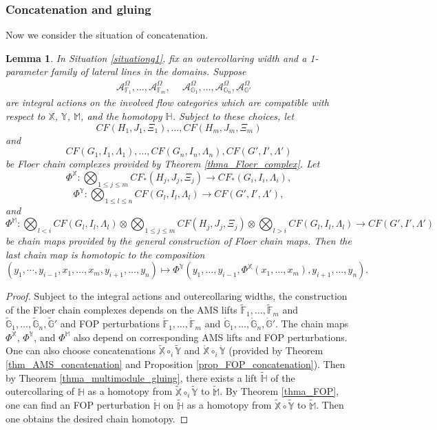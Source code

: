\documentclass[reqno, 10pt]{amsart}
\numberwithin{equation}{section}
\numberwithin{equation}{section}
\newtheorem{lemma}[thm]{Lemma}
\theoremstyle{definition}
\theoremstyle{remark}
\newcommand{\beqn}{\begin{equation*}}
\newcommand{\eeqn}{\end{equation*}}
\newcommand{\mb}{\mathbb}
\newcommand{\mc}{\mathcal}
\begin{document}
\subsubsection{Concatenation and gluing}

Now we consider the situation of concatenation. 

\begin{lemma}\label{lemma135}
In Situation \ref{situationg1}, fix an outercollaring width and a 1-parameter family of lateral lines in the domains. Suppose
\begin{align*}
&\ {\mc A}_{{\mb F}_1}^{\Omega},\ldots, {\mc A}_{{\mb F}_m}^\Omega,\ &\ {\mc A}_{{\mb G}_1}^\Omega,\ldots, {\mc A}_{{\mb G}_n}^\Omega, {\mc A}_{{\mb G}'}^\Omega
\end{align*}
are integral actions on the involved flow categories which are compatible with respect to ${\mb X}$, ${\mb Y}$, ${\mb M}$, and the homotopy ${\mb H}$. Subject to these choices, let
\beqn
CF(H_1, J_1, \Xi_1), \ldots, CF(H_m, J_m, \Xi_m)
\eeqn
and 
\beqn
CF(G_1, I_1, \Lambda_1), \ldots, CF(G_n, I_n, \Lambda_n), CF(G', I', \Lambda')
\eeqn
be Floer chain complexes provided by Theorem \ref{thma_Floer_complex}. Let 
\beqn
\Phi^{{\mb X}}: \bigotimes_{1\leq j \leq m} CF_*(H_j, J_j, \Xi_j) \to CF_*(G_i, I_i, \Lambda_i),
\eeqn
\beqn
\Phi^{\mb Y}: \bigotimes_{1 \leq l \leq n} CF(G_l, I_l, \Lambda_l) \to CF(G', I', \Lambda'),
\eeqn
and
\beqn
\Phi^{{\mb M}}: \bigotimes_{l<i} CF(G_l, I_l, \Lambda_l) \otimes \bigotimes_{1 \leq j \leq m} CF(H_j, J_j, \Xi_j) \otimes \bigotimes_{l>i} CF(G_l, I_l, \Lambda_l) \to CF(G', I', \Lambda')
\eeqn
be chain maps provided by the general construction of Floer chain maps. Then the last chain map is homotopic to the composition
\beqn
(y_1, \cdots, y_{i-1}, x_1, \ldots, x_m, y_{i+1}, \ldots, y_n) \mapsto \Phi^{{\mb Y}} (y_1, \ldots, y_{i-1}, \Phi^{\mb X}(x_1,\ldots, x_m), y_{i+1}, \ldots, y_n).
\eeqn
\end{lemma}

\begin{proof}
Subject to the integral actions and outercollaring widths, the construction of the Floer chain complexes depends on the AMS lifts $\tilde {\mb F}_1, \ldots, \tilde {\mb F}_m$ and $\tilde {\mb G}_1, \ldots, \tilde {\mb G}_n, \tilde {\mb G}'$ and FOP perturbations $\mathring {\mb F}_1, \ldots, \mathring {\mb F}_m$ and $\mathring {\mb G}_1, \ldots, \mathring {\mb G}_n, \mathring {\mb G}'$. The chain maps $\Phi^{\mb X}$, $\Phi^{\mb Y}$, and $\Phi^{\mb M}$ also depend on corresponding AMS lifts and FOP perturbations. One can also choose concatenations $\tilde {\mb X} \circ_i \tilde {\mb Y}$ and $\mathring {\mb X} \circ_i \mathring {\mb Y}$ (provided by Theorem \ref{thm_AMS_concatenation} and Proposition \ref{prop_FOP_concatenation}). 
Then by Theorem \ref{thma_multimodule_gluing}, there exists a lift $\tilde {\mb H}$ of the outercollaring of ${\mb H}$ as a homotopy from $\tilde {\mb X} \circ_i \tilde {\mb Y}$ to $\tilde {\mb M}$. By Theorem \ref{thma_FOP}, one can find an FOP perturbation $\mathring {\mb H}$ on $\tilde {\mb H}$ as a homotopy from $\tilde {\mb X} \circ \tilde {\mb Y}$ to $\tilde {\mb M}$. Then one obtains the desired chain homotopy.
\end{proof}
\end{document}
